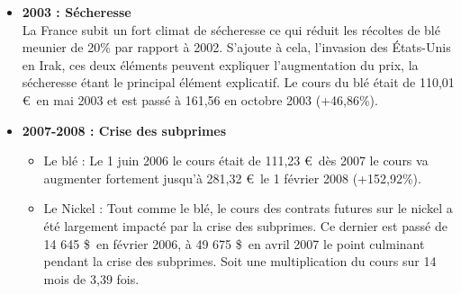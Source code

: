 \begin{itemize}
    \item \textbf{2003 : Sécheresse}\\
    La France subit un fort climat de sécheresse ce qui réduit les récoltes de blé meunier de 20\% par rapport à 2002. S'ajoute à cela, l'invasion des États-Unis en Irak, 
    ces deux éléments peuvent expliquer l'augmentation du prix, la sécheresse étant le principal élément explicatif.
    Le cours du blé était de 110,01 \euro\ en mai 2003 et est passé à 161,56  en octobre 2003 (+46,86\%).

    \item \textbf{2007-2008 : Crise des subprimes}
    \begin{itemize}
        \item Le blé : Le 1 juin 2006 le cours était de 111,23 \euro\, dès 2007 le cours va augmenter fortement jusqu'à 281,32 \euro\ le 1 février 2008 (+152,92\%).
        \item Le Nickel :  Tout comme le blé, le cours des contrats futures sur le nickel a été largement impacté par la crise des subprimes. Ce dernier est passé de 14 645 \$\ en février 2006, à 49 675 \$\ en avril 2007 le point culminant pendant la crise des subprimes. Soit une multiplication du cours sur 14 mois de 3,39 fois.
    \end{itemize}
    

\end{itemize}
